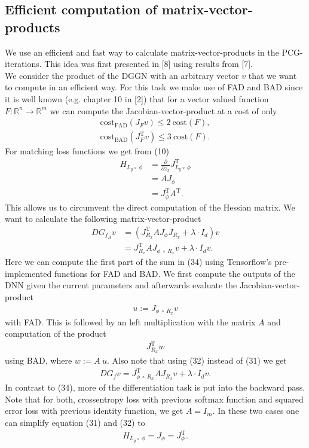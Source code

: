 \documentclass[conference]{IEEEtran}
\begin{document}
	\subsection{Efficient computation of matrix-vector-products}
	\noindent
	We use an efficient and fast way to calculate matrix-vector-products in the PCG-iterations. This idea was first presented in [8] using results from [7].\\
	We consider the product of the DGGN with an arbitrary vector $v$ that we want to compute in an efficient way.
	For this task we make use of FAD and BAD since it is well known (e.g. chapter 10 in [2]) that for a vector valued function $F:\mathbb{R}^{n}\rightarrow\mathbb{R}^{m}$ we can compute the Jacobian-vector-product at a cost of only
	\begin{align}
	\mathrm{cost}_{\text{FAD}}(J_{F}v)\leq 2\:\mathrm{cost}(F),\\
	\mathrm{cost}_{\text{BAD}}(J_{F}^{\mathrm{T}}v)\leq 3\:\mathrm{cost}(F).
	\end{align}
	For matching loss functions we get from (10)
	\begin{align}
	H_{L_{y}\circ\:\phi} &= \frac{\partial}{\partial z_{x}}J_{L_{y}\circ\:\phi}^{\mathrm{T}}\\
	&= AJ_{\phi} \\
	&= J_{\phi}^{\mathrm{T}}A^{\mathrm{T}}.
	\end{align}
	This allows us to circumvent the direct computation of the Hessian matrix. We want to calculate the following matrix-vector-product
	\begin{align}
	DG_{f_{B}}v &=  \left(J_{R_{x}}^{\mathrm{T}}AJ_{\phi}J_{R_{x}} + \lambda\cdot I_{d}\right)v\\
	&= J_{R_{x}}^{\mathrm{T}}AJ_{\phi\:\circ\: R _{x}}v + \lambda\cdot I_{d}v.
	\end{align}
	Here we can compute the first part of the sum in (34) using Tensorflow's pre-implemented functions for FAD and BAD. We first compute the outputs of the DNN given the current parameters and afterwards evaluate the Jacobian-vector-product
	\begin{align}
	u := J_{\phi\:\circ\: R _{x}}v
	\end{align}
	with FAD. This is followed by an left multiplication with the matrix $A$ and computation of the product
	\begin{align}
	J_{R_{x}}^{\mathrm{T}}w
	\end{align}
	using BAD, where $w := A\:u$. Also note that using (32) instead of (31) we get
	\begin{align}
	DG_{f}v  = J_{\phi\:\circ\:R _{x}}^{\mathrm{T}}AJ_{R _{x}}v + \lambda\cdot I_{d}v.
	\end{align}
	In contrast to (34), more of the differentiation task is put into the backward pass.\\
	Note that for both, crossentropy loss with previous softmax function and squared error loss with previous identity function, we get $A = I_{m}$. In these two cases one can simplify equation (31) and (32) to
	\begin{align}
	H_{L_{y}\circ\:\phi} = J_{\phi} = J_{\phi}^{\mathrm{T}}.
	\end{align}
	
\end{document}
